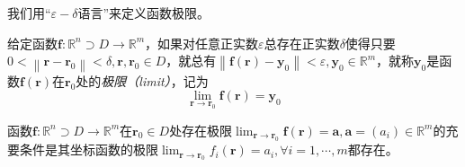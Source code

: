 \documentclass[main.tex]{subfiles}
\begin{document}
我们用“$\varepsilon-\delta$语言”来定义函数极限。

\begin{definition}[向量函数的极限]\label{def:II.4.5}
    给定函数$\mathbf{f}:\mathbb{R}^n\supset D\rightarrow\mathbb{R}^m$，如果对任意正实数$\varepsilon$总存在正实数$\delta$使得只要$0<\left\|\mathbf{r}-\mathbf{r}_0\right\|<\delta,\mathbf{r},\mathbf{r}_0\in D$，就总有$\left\|\mathbf{f}\left(\mathbf{r}\right)-\mathbf{y}_0\right\|<\varepsilon,\mathbf{y}_0\in\mathbb{R}^m$，就称$\mathbf{y}_0$是函数$\mathbf{f}\left(\mathbf{r}\right)$在$\mathbf{r}_0$处的\emph{极限（limit）}，记为
    \[\lim_{\mathbf{r} \to\mathbf{r}_0} \mathbf{f}\left(\mathbf{r}\right)=\mathbf{y}_0\]
\end{definition}

\begin{theorem}\label{thm:II.4.1}
    函数$\mathbf{f}:\mathbb{R}^n\supset D\rightarrow\mathbb{R}^m$在$\mathbf{r}_0\in D$处存在极限$\lim_{\mathbf{r}\to\mathbf{r}_0}\mathbf{f}\left(\mathbf{r}\right)=\mathbf{a},\mathbf{a}=\left(a_i\right)\in\mathbb{R}^m$的充要条件是其坐标函数的极限$\lim_{\mathbf{r}\to\mathbf{r}_0}f_i\left(\mathbf{r}\right)=a_i,\forall i=1,\cdots,m$都存在。
\end{theorem}
\end{document}
